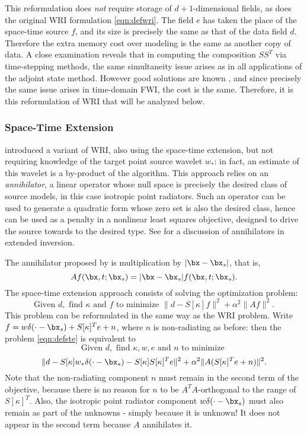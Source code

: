 This reformulation does {\em not} require storage of $d+1$-dimensional
fields, as does the original WRI formulation \ref{eqn:defwri}. The
field $e$ has taken the place of the space-time source $f$, and its
size is precisely the same as that of the data field $d$. Therefore
the extra memory cost over modeling is the same as another copy of
data. A close examination reveals that in computing the composition
$SS^T$ via time-stepping methods, the same simultaneity issue arises
as in all applications of the adjoint state method. However good
solutions are known \cite[]{Griewank:book}, and since precisely the
same issue arises in time-domain FWI, the cost is the same. Therefore,
it is this reformulation of WRI that will be analyzed below.

\subsubsection{Space-Time Extension}
\cite{HuangSymes:Geo18a} introduced a variant of WRI, also using the space-time extension, but not
requiring knowledge of the target point source wavelet $w_*$: in fact,
an estimate of this wavelet is a by-product of the algorithm. This
approach relies on an {\em annihilator}, a linear operator whose null
space is precisely the desired class of source models, in this case
isotropic point radiators. Such an operator can be used to generate a
quadratic form whose zero set is also the desired class, hence can be
used as a penalty in a nonlinear least squares objective, designed to
drive the source towards to the desired type. See \cite{geoprosp:2008}
for a discussion of annihilators in extended inversion.

The annihilator proposed by \cite{HuangSymes:Geo18a} is multiplication
by $|\bx-\bx_s|$, that is,
\begin{equation}
  \label{eqn:defann}
  Af(\bx,t;\bx_s) = |\bx-\bx_s|f(\bx,t;\bx_s).
\end{equation}
The space-time extension approach consists of solving the optimization
problem:
\begin{equation}
  \label{eqn:defste}
  \mbox{Given } d, \mbox{ find }\kappa \mbox{ and }f \mbox{ to
    minimize }
  \| d -  S[\kappa]f\|^2+\alpha^2\|Af\|^2.
\end{equation}
This problem can be reformulated in the same way as the WRI problem. Write
$f = w\delta(\cdot-\bx_s) + S[\kappa]^Te + n$, where $n$ is
non-radiating as before: then the problem \ref{eqn:defste} is
equivalent to
\[
   \mbox{Given } d, \mbox{ find }\kappa, w, e \mbox{ and }n \mbox{ to
     minimize }
 \]
\begin{equation}
  \label{eqn:defstereform}
  \| d -  S[\kappa]w_*\delta(\cdot-\bx_s) - S[\kappa]S[\kappa]^Te\|^2+\alpha^2\|A(S[\kappa]^Te+n)\|^2.
\end{equation}
Note that the non-radiating component $n$ must remain in the second
term of the objective, because there is no reason for $n$ to be
$A^TA$-orthogonal to the range of $S[\kappa]^T$. Also, the isotropic
point radiator component $w\delta(\cdot-\bx_s)$ must also remain as
part of the unknowns - simply because it is unknown! It does not
appear in the second term because $A$ annihilates it.

